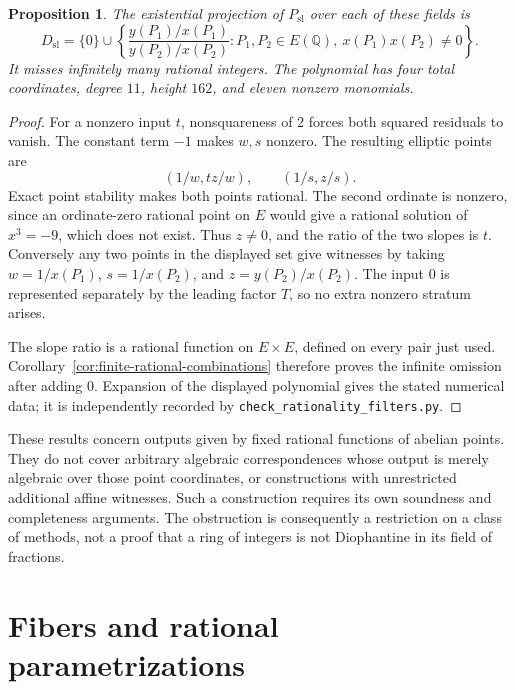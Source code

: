 \documentclass[11pt,a4paper]{article}
\newtheorem{proposition}[theorem]{Proposition}
\theoremstyle{definition}
\newcommand{\Q}{\mathbb Q}\newcommand{\Z}{\mathbb Z}
\begin{document}
\begin{proposition}\label{prop:slope-filter}
The existential projection of $P_{\mathrm{sl}}$ over each of these
fields is
\[
 D_{\mathrm{sl}}=\{0\}\cup
 \left\{\frac{y(P_1)/x(P_1)}{y(P_2)/x(P_2)}:
 P_1,P_2\in E(\Q),\ x(P_1)x(P_2)\ne0\right\}.
\]
It misses infinitely many rational integers. The polynomial has
four total coordinates, degree $11$, height $162$, and eleven
nonzero monomials.
\end{proposition}
\begin{proof}
For a nonzero input $t$, nonsquareness of $2$ forces both squared
residuals to vanish. The constant term $-1$ makes $w,s$ nonzero.
The resulting elliptic points are
\[
                   (1/w,tz/w),\qquad(1/s,z/s).
\]
Exact point stability makes both points rational. The second
ordinate is nonzero, since an ordinate-zero rational point on
$E$ would give a rational solution of $x^3=-9$, which does not
exist. Thus $z\ne0$, and the ratio of the two slopes is $t$.
Conversely any two points in the displayed set give witnesses by
taking $w=1/x(P_1)$, $s=1/x(P_2)$, and
$z=y(P_2)/x(P_2)$. The input $0$ is represented separately by
the leading factor $T$, so no extra nonzero stratum arises.

The slope ratio is a rational function on $E\times E$, defined
on every pair just used. Corollary~\ref{cor:finite-rational-combinations}
therefore proves the infinite omission after adding $0$.
Expansion of the displayed polynomial gives the stated numerical
data; it is independently recorded by
\nolinkurl{check_rationality_filters.py}.
\end{proof}

These results concern outputs given by fixed rational functions of
abelian points. They do not cover arbitrary algebraic correspondences
whose output is merely algebraic over those point coordinates, or
constructions with unrestricted additional affine witnesses.
Such a construction requires its own soundness and completeness
arguments. The obstruction is consequently a restriction on a class
of methods, not a proof that a ring of integers is not Diophantine
in its field of fractions.

\section{Fibers and rational parametrizations}
\end{document}
